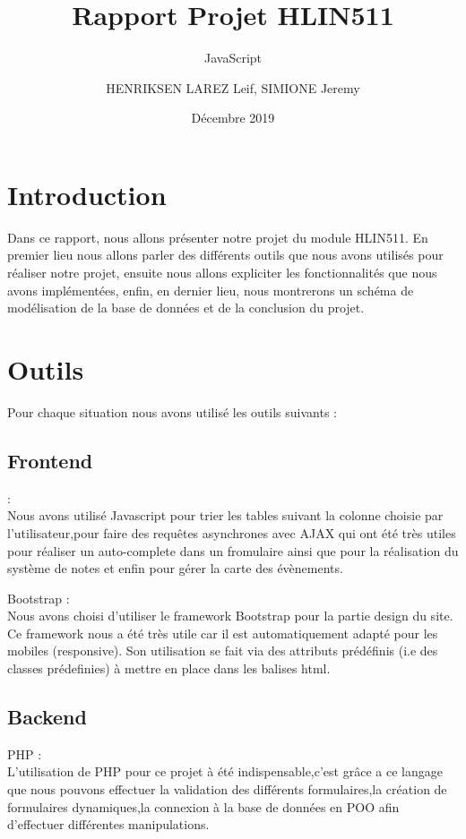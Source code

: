 \documentclass[french]{article}
\title{Rapport Projet HLIN511}
\author{HENRIKSEN LAREZ Leif, SIMIONE Jeremy}
\date{Décembre 2019}
\begin{document}
    \begin{titlepage}
        \clearpage\maketitle
        \thispagestyle{empty}
    \end{titlepage}
    \newpage
        \tableofcontents
    \newpage
        \section{Introduction}
            Dans ce rapport, nous allons présenter notre projet du module HLIN511. En premier lieu nous allons parler des différents outils que nous avons utilisés pour réaliser notre projet, ensuite nous allons expliciter les fonctionnalités que nous avons implémentées, enfin, en dernier lieu, nous montrerons un schéma de modélisation de la base de données et de la conclusion du projet.
        \section{Outils}
            Pour chaque situation nous avons utilisé les outils suivants :
            \subsection{Frontend}
            \subtitle{JavaScript} : \\Nous avons utilisé Javascript pour trier les tables suivant la colonne choisie par l'utilisateur,pour faire des requêtes asynchrones avec AJAX qui ont été très utiles pour réaliser un auto-complete dans un fromulaire ainsi que pour la réalisation du système de notes et enfin pour gérer la carte des évènements.\\
            \par
             Bootstrap : \\ Nous avons choisi d'utiliser le framework Bootstrap pour la partie design du site.
            Ce framework nous a été très utile car il est automatiquement adapté pour les mobiles (responsive).
            Son utilisation se fait via des attributs prédéfinis (i.e des classes prédefinies) à mettre en place dans les balises html. 
            
            \subsection{Backend}
            PHP :\\ L'utilisation de PHP pour ce projet à été indispensable,c'est grâce a ce langage que nous pouvons effectuer la validation des différents formulaires,la création de formulaires dynamiques,la connexion à la base de données en POO afin d'effectuer différentes manipulations.
\end{document}
